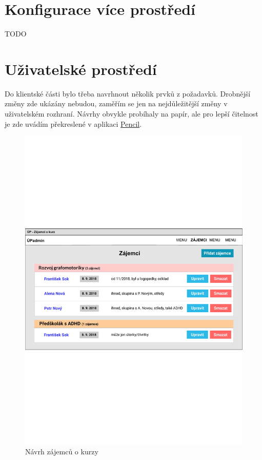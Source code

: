 \section{Konfigurace více prostředí}\label{sec:konfiguraceviceprostredi}

TODO

\section{Uživatelské prostředí}

Do klientské části bylo třeba navrhnout několik prvků z požadavků. Drobnější změny zde ukázány nebudou, zaměřím se jen na nejdůležitější změny v uživatelském rozhraní. Návrhy obvykle probíhaly na papír, ale pro lepší čitelnost je zde uvádím překreslené v aplikaci \href{https://pencil.evolus.vn/}{Pencil}.

\begin{figure}[h]\centering
    \includegraphics[width=1\textwidth]{img/ui-zajemci}
    \caption{Návrh zájemců o kurzy}\label{fig:ui-zajemci}
\end{figure}

